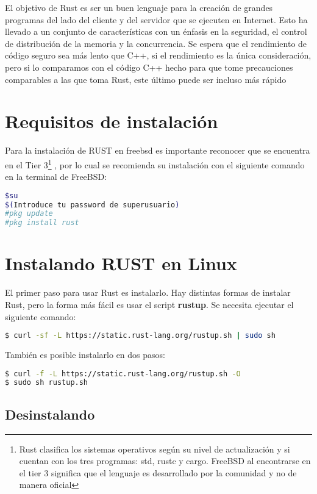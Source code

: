\documentclass[12pt, twoside]{report}
\begin{document}
El objetivo de Rust es ser un buen lenguaje para la creación de grandes programas del lado del cliente y del servidor que se ejecuten en Internet. Esto ha llevado a un conjunto de características con un énfasis en la seguridad, el control de distribución de la memoria y la concurrencia. Se espera que el rendimiento de código seguro sea más lento que C++, si el rendimiento es la única consideración, pero si lo comparamos con el código C++ hecho para que tome precauciones comparables a las que toma Rust, este último puede ser incluso más rápido

\section{Requisitos de instalación}

Para la instalación de RUST en freebsd es importante reconocer que se encuentra en el Tier 3\footnote{Rust clasifica los sistemas operativos según 
su nivel de actualización y si cuentan con los tres programas: std, rustc y cargo. FreeBSD al encontrarse en el tier 3 significa que el lenguaje es desarrollado por la comunidad y no de manera oficial} , por lo cual se recomienda su instalación con el siguiente comando en la terminal de FreeBSD:

\begin{lstlisting}[language=bash]
$su 
$(Introduce tu password de superusuario)
#pkg update
#pkg install rust
\end{lstlisting}

\section{Instalando RUST en Linux}

El primer paso para usar Rust es instalarlo. Hay distintas formas de instalar Rust, pero la forma más fácil es usar el script \textbf{rustup}. Se necesita ejecutar el siguiente comando:

\begin{lstlisting}[language=bash]
$ curl -sf -L https://static.rust-lang.org/rustup.sh | sudo sh
\end{lstlisting}

También es posible instalarlo en dos pasos:

\begin{lstlisting}[language=bash]
$ curl -f -L https://static.rust-lang.org/rustup.sh -O
$ sudo sh rustup.sh
\end{lstlisting}

\subsection{Desinstalando}
\end{document}
